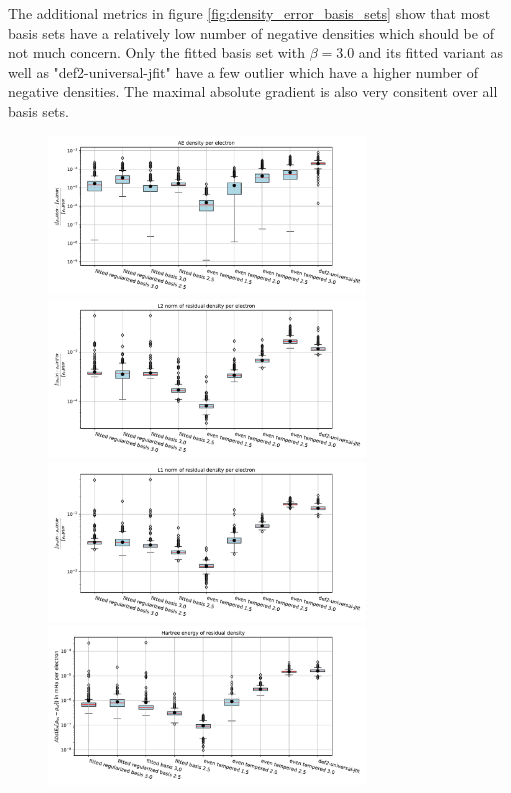{The additional metrics in figure \ref{fig:density_error_basis_sets} show that most basis sets have a relatively low number of negative densities which should be of not much concern. Only the fitted basis set with $\beta = 3.0$ and its fitted variant as well as "def2-universal-jfit" have a few outlier which have a higher number of negative densities. The maximal absolute gradient is also very consitent over all basis sets.\\
\begin{figure}
    \centering
        \includegraphics[width=0.75\textwidth]{chapters/results/results_images/AE_density_on_hartree+external_MOFDFT_for_different_basis_sets}
    \includegraphics[width=0.75\textwidth]{chapters/results/results_images/L2_residual_densities_on_hartree+external_MOFDFT_for_different_basis_sets}
    \includegraphics[width=0.75\textwidth]{chapters/results/results_images/L1_residual_densities_on_hartree+external_MOFDFT_for_different_basis_sets}
    \includegraphics[width=0.75\textwidth]{chapters/results/results_images/L2_residual_hartree_on_hartree+external_MOFDFT_for_different_basis_sets}

\end{figure}}
